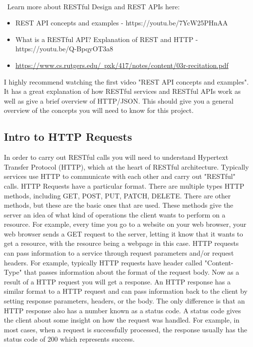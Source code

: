 \documentclass{article}
\begin{document}
\-\\\ Learn more about RESTful Design and REST APIs here:
\begin{itemize}
\item REST API concepts and examples - https://youtu.be/7YcW25PHnAA 
\item What is a RESTful API? Explanation of REST and HTTP - https://youtu.be/Q-BpqyOT3a8
\item \href{https://www.cs.rutgers.edu/~pxk/417/notes/content/03r-recitation.pdf}{https://www.cs.rutgers.edu/~pxk/417/notes/content/03r-recitation.pdf}
\end{itemize}

\begin{info}
I highly recommend watching the first video "REST API concepts and examples". It has a great explanation of how RESTful services and RESTful APIs work as well as give a brief overview of HTTP/JSON. This should give you a general overview of the concepts you will need to know for this project.
\end{info}

\subsection*{Intro to HTTP Requests}
In order to carry out RESTful calls you will need to understand Hypertext Transfer Protocol (HTTP), which at the heart of RESTful architecture. Typically services use HTTP to communicate with each  other and carry out "RESTful" calls. HTTP Requests have a particular format. There are multiple types HTTP methods, including GET, POST, PUT, PATCH, DELETE. There are other methods, but these are the basic ones that are used. These methods give the server an idea of what kind of operations the client wants to perform on a resource. For example, every time you go to a website on your web browser, your web browser sends a GET request to the server, letting it know that it wants to get a resource, with the resource being a webpage in this case. HTTP requests can pass information to a service through request parameters and/or request headers. For example, typically HTTP requests have header called "Content-Type" that passes information about the format of the request body.  Now as a result of a HTTP request you will get a response. An HTTP response has a similar format to a HTTP request and can pass information back to the client by setting response parameters, headers, or the body. The only difference is that an HTTP response also has a number known as a status code. A status code gives the client about some insight on how the request was handled. For example, in most cases, when a request is successfully processed, the response usually has the status code of 200 which represents success. 
\end{document}
